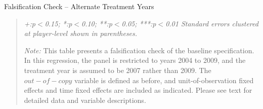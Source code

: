 \begin{center}
\begin{table}[!htbp]

\caption{Falsification Check -- Alternate Treatment Years}
\vspace{5mm}
%

\begin{quote}
\vspace{5mm}

\emph{+:p$<$0.15; *:p$<$0.10; **:p$<$0.05; ***:p$<$0.01 
\newline
Standard errors clustered at player-level shown in parentheses.}

\vspace{5mm}

\emph{Note:} This table presents a falsification check of the baseline specification. In this regression, the panel is restricted to years 2004 to 2009, and the treatment year is assumed to be 2007 rather than 2009. The $out-of-copy$ variable is defined as before, and unit-of-observation fixed effects and time fixed effects are included as indicated. Please see text for detailed data and variable descriptions. 
\end{quote}
\label{tab:false}
\end{table}
\end{center}


